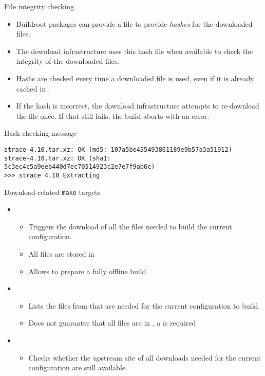 \begin{frame}[fragile]{File integrity checking}
  \begin{itemize}
  \item Buildroot packages can provide a  file to provide
    {\em hashes} for the downloaded files.
  \item The download infrastructure uses this hash file when available
    to check the integrity of the downloaded files.
  \item Hashs are checked every time a downloaded file is used, even
    if it is already cached in .
  \item If the hash is incorrect, the download infrastructure attempts
    to re-download the file once. If that still fails, the build
    aborts with an error.
  \end{itemize}

  \begin{block}{Hash checking message}
{\scriptsize
\begin{verbatim}
strace-4.10.tar.xz: OK (md5: 107a5be455493861189e9b57a3a51912)
strace-4.10.tar.xz: OK (sha1: 5c3ec4c5a9eeb440d7ec70514923c2e7e7f9ab6c)
>>> strace 4.10 Extracting
\end{verbatim}}
  \end{block}
\end{frame}

\begin{frame}{Download-related {\tt make} targets}
  \begin{itemize}
  \item {}
    \begin{itemize}
    \item Triggers the download of all the files needed to build the
      current configuration.
    \item All files are stored in 
    \item Allows to prepare a fully offline build
    \end{itemize}
  \item {}
    \begin{itemize}
    \item Lists the files from  that are needed for
      the current configuration to build.
    \item Does not guarantee that all files are in , a
       is required
    \end{itemize}
  \item {}
    \begin{itemize}
    \item Checks whether the upstream site of all downloads needed for
      the current configuration are still available.
    \end{itemize}
  \end{itemize}
\end{frame}
